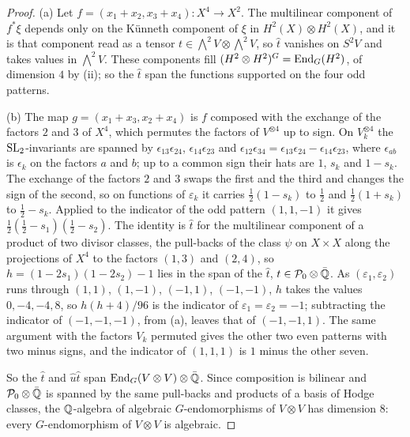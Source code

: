 \begin{proof}
(a) Let $f=(x_{1}+x_{2},x_{3}+x_{4})\colon X^{4}\to X^{2}$. The multilinear
component of $f^{*}\xi$ depends only on the K\"unneth component of $\xi$ in
$H^{2}(X)\otimes H^{2}(X)$, and it is that component read as a tensor
$t\in\bigwedge^{2}V\otimes\bigwedge^{2}V$, so $\hat{t}$ vanishes on $S^{2}V$
and takes values in $\bigwedge^{2}V$. These components fill
$(H^{2}\otimes H^{2})^{G}=\operatorname{End}_{G}(H^{2})$, of dimension $4$ by
(ii); so the $\hat{t}$ span the functions supported on
the four odd patterns.

(b) The map $g=(x_{1}+x_{3},x_{2}+x_{4})$ is $f$ composed with the exchange
of the factors $2$ and $3$ of $X^{4}$, which permutes the factors of
$V^{\otimes4}$ up to sign. On $V_{k}^{\otimes4}$ the $\operatorname{SL}_{2}$-invariants are
spanned by $\epsilon_{13}\epsilon_{24}$, $\epsilon_{14}\epsilon_{23}$ and
$\epsilon_{12}\epsilon_{34}=\epsilon_{13}\epsilon_{24}-\epsilon_{14}
\epsilon_{23}$, where $\epsilon_{ab}$ is $\epsilon_{k}$ on the factors $a$ and
$b$; up to a common sign their hats are $1$, $s_{k}$ and $1-s_{k}$. The
exchange of the factors $2$ and $3$ swaps the first and the third and changes
the sign of the second, so on functions of $\varepsilon_{k}$ it carries
$\frac12(1-s_{k})$ to $\frac12$ and $\frac12(1+s_{k})$ to $\frac12-s_{k}$.
Applied to the indicator of the odd pattern $(1,1,-1)$ it gives
$\frac12(\frac12-s_{1})(\frac12-s_{2})$. The identity is $\hat{t}$ for the
multilinear component of a product of two divisor classes, the pull-backs of
the class $\psi$ on $X\times X$ along the projections of $X^{4}$ to the
factors $(1,3)$ and $(2,4)$, so $h=(1-2s_{1})(1-2s_{2})-1$ lies in the span of the
$\hat{t}$, $t\in\mathcal{P}_{0}\otimes\bar{\mathbb{Q}}$. As $(\varepsilon_{1},\varepsilon_{2})$
runs through $(1,1)$, $(1,-1)$, $(-1,1)$, $(-1,-1)$, $h$ takes the values
$0,-4,-4,8$, so $h(h+4)/96$ is the indicator of
$\varepsilon_{1}=\varepsilon_{2}=-1$; subtracting the indicator of
$(-1,-1,-1)$, from (a), leaves that of $(-1,-1,1)$. The same argument with the
factors $V_{k}$ permuted gives the other two even patterns with two minus
signs, and the indicator of $(1,1,1)$ is $1$ minus the other seven.

So the $\hat{t}$ and $\hat{u}\hat{t}$ span $\operatorname{End}_{G}(V\otimes V)\otimes
\bar{\mathbb{Q}}$. Since composition is bilinear and $\mathcal{P}_{0}\otimes
\bar{\mathbb{Q}}$ is spanned by the same pull-backs and products of a basis of
Hodge classes, the $\mathbb{Q}$-algebra of algebraic $G$-endomorphisms of
$V\otimes V$ has dimension $8$: every $G$-endomorphism of $V\otimes V$ is
algebraic.


\end{proof}
